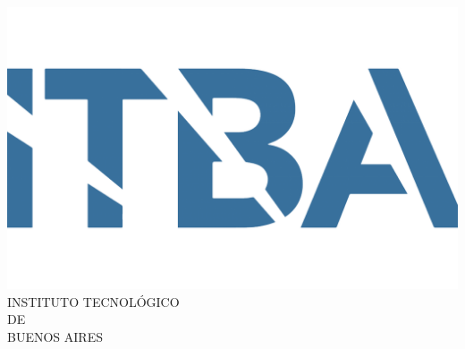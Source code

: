 



%

\begin{titlepage}
\newcommand{\HRule}{\rule{\linewidth}{0.5mm}} %

\center

\includegraphics[scale = 0.15]{resources/itba.png}\\[1cm] %
 

\textsc{\Large INSTITUTO TECNOLÓGICO \\DE \\[0.3cm]BUENOS AIRES }\\[0.6cm] %


\end{titlepage}
